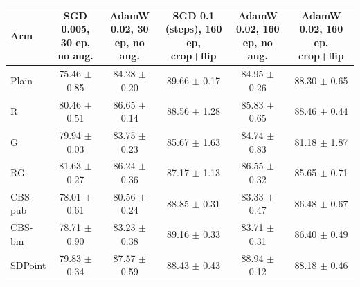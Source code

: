 \begin{tabular}{lccccc}
\toprule
Arm & SGD 0.005, 30 ep, no aug. & AdamW 0.02, 30 ep, no aug. & SGD 0.1 (steps), 160 ep, crop+flip & AdamW 0.02, 160 ep, no aug. & AdamW 0.02, 160 ep, crop+flip \\
\midrule
Plain & 75.46 $\pm$ 0.85 & 84.28 $\pm$ 0.20 & 89.66 $\pm$ 0.17 & 84.95 $\pm$ 0.26 & 88.30 $\pm$ 0.65 \\
R & 80.46 $\pm$ 0.51 & 86.65 $\pm$ 0.14 & 88.56 $\pm$ 1.28 & 85.83 $\pm$ 0.65 & 88.46 $\pm$ 0.44 \\
G & 79.94 $\pm$ 0.03 & 83.75 $\pm$ 0.23 & 85.67 $\pm$ 1.63 & 84.74 $\pm$ 0.83 & 81.18 $\pm$ 1.87 \\
RG & 81.63 $\pm$ 0.27 & 86.24 $\pm$ 0.36 & 87.17 $\pm$ 1.13 & 86.55 $\pm$ 0.32 & 85.65 $\pm$ 0.71 \\
CBS-pub & 78.01 $\pm$ 0.61 & 80.56 $\pm$ 0.24 & 88.85 $\pm$ 0.31 & 83.33 $\pm$ 0.47 & 86.48 $\pm$ 0.67 \\
CBS-bm & 78.71 $\pm$ 0.90 & 83.23 $\pm$ 0.38 & 89.16 $\pm$ 0.33 & 83.71 $\pm$ 0.31 & 86.40 $\pm$ 0.49 \\
SDPoint & 79.83 $\pm$ 0.34 & 87.57 $\pm$ 0.59 & 88.43 $\pm$ 0.43 & 88.94 $\pm$ 0.12 & 88.18 $\pm$ 0.46 \\
\bottomrule
\end{tabular}
